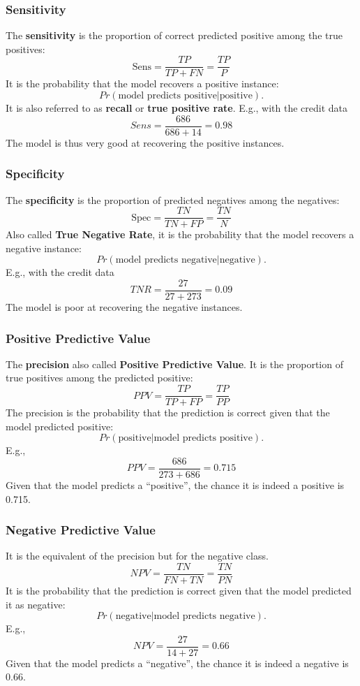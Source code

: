 \begin{frame}
\frametitle{Sensitivity}
The {\bf sensitivity} is the proportion of correct predicted positive among the true positives:
$$
\mbox{Sens}=\frac{TP}{TP+FN}=\frac{TP}{P}
$$
It is the probability that the model recovers a positive instance:
$$
Pr\left(\mbox{model predicts positive}|\mbox{positive}\right).
$$
It is also referred to as {\bf recall} or {\bf true positive rate}. E.g., with the credit data
$$
Sens=\frac{686}{686+14}=0.98
$$
The model is thus very good at recovering the positive instances.
\end{frame}
\begin{frame}
\frametitle{Specificity}
The {\bf specificity} is the proportion of predicted negatives among the negatives:
$$
\mbox{Spec}=\frac{TN}{TN+FP}=\frac{TN}{N}
$$
Also called {\bf True Negative Rate}, it is the probability that the model recovers a negative instance:
$$
Pr\left(\mbox{model predicts negative}|\mbox{negative}\right).
$$
E.g., with the credit data
$$
TNR=\frac{27}{27+273}=0.09
$$
The model is poor at recovering the negative instances.
\end{frame}
\begin{frame}
\frametitle{Positive Predictive Value}
The {\bf precision} also called {\bf Positive Predictive Value}. It is the proportion of true positives among the predicted positive:
$$
PPV=\frac{TP}{TP+FP}=\frac{TP}{PP}
$$
The precision is the probability that the prediction is correct given that the model predicted positive:
$$
Pr\left(\mbox{positive}|\mbox{model predicts positive}\right).
$$
E.g., 
$$
PPV = \frac{686}{273+686} = 0.715
$$
Given that the model predicts a ``positive'', the chance it is indeed a positive is 0.715.  
\end{frame}
\begin{frame}
\frametitle{Negative Predictive Value}
It is the equivalent of the precision but for the negative class.
$$
NPV=\frac{TN}{FN+TN}=\frac{TN}{PN}
$$
It is the probability that the prediction is correct given that the model predicted it as negative:
$$
Pr\left(\mbox{negative}|\mbox{model predicts negative}\right).
$$
E.g., 
$$
NPV = \frac{27}{14+27} = 0.66
$$
Given that the model predicts a ``negative'', the chance it is indeed a negative is 0.66.
\end{frame}
